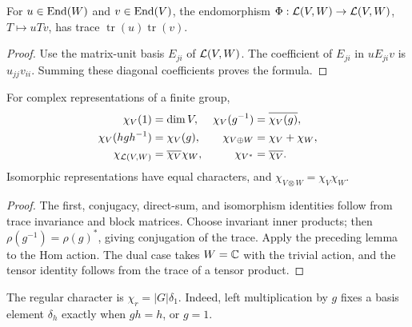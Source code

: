 
\begin{lem}
\label{lem-dem-character-morphism}
For $u\in\operatorname{End}(W)$ and $v\in\operatorname{End}(V)$, the endomorphism
$\Phi:\mathcal{L}(V,W)\to\mathcal{L}(V,W)$, $T\mapsto uTv$, has trace
$\operatorname{tr}(u)\operatorname{tr}(v)$.
\end{lem}
\begin{proof}
Use the matrix-unit basis $E_{ji}$ of $\mathcal{L}(V,W)$. The coefficient of
$E_{ji}$ in $uE_{ji}v$ is $u_{jj}v_{ii}$. Summing these diagonal
coefficients proves the formula.
\end{proof}


\begin{prop}
\label{prop-ptes-caracteres}
For complex representations of a finite group,
\[
 \begin{aligned}
 \chi_V(1)&=\dim V,&\chi_V(g^{-1})&=\overline{\chi_V(g)},\\
 \chi_V(hgh^{-1})&=\chi_V(g),&\chi_{V\oplus W}&=\chi_V+\chi_W,\\
 \chi_{\mathcal{L}(V,W)}&=\overline{\chi_V}\chi_W,&\chi_{V^*}&=\overline{\chi_V}.
 \end{aligned}
\]
Isomorphic representations have equal characters, and
$\chi_{V\otimes W}=\chi_V\chi_W$.
\end{prop}
\begin{proof}
The first, conjugacy, direct-sum, and isomorphism identities follow from
trace invariance and block matrices. Choose invariant inner products;
then $\rho(g^{-1})=\rho(g)^*$, giving conjugation of the trace.
Apply the preceding lemma to the Hom action. The dual case takes $W=\mathbb{C}$
with the trivial action, and the tensor identity follows from the trace
of a tensor product.
\end{proof}


\begin{exmp}
\label{exmp-regular-representation}
The regular character is $\chi_r=|G|\delta_1$. Indeed, left multiplication
by $g$ fixes a basis element $\delta_h$ exactly when $gh=h$, or $g=1$.
\end{exmp}

